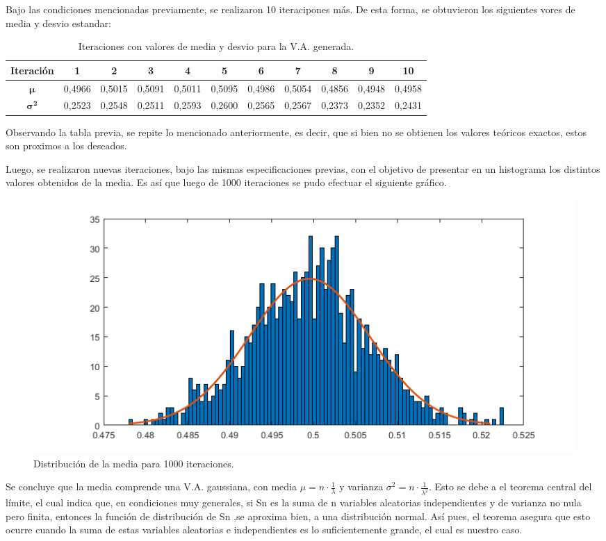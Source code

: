 Bajo las condiciones mencionadas previamente, se realizaron 10 iteracipones más. De esta forma, se obtuvieron los siguientes vores de media y desvio estandar:
\begin{table}[H]
\centering
\begin{tabular}{ccccccccccc}
\hline
\textbf{Iteración}      & \textbf{1} & \textbf{2} & \textbf{3} & \textbf{4} & \textbf{5} & \textbf{6} & \textbf{7} & \textbf{8} & \textbf{9} & \textbf{10} \\ \hline
$\mathbf{\mu}$          & 0,4966     & 0,5015     & 0,5091     & 0,5011     & 0,5095     & 0,4986     & 0,5054     & 0,4856     & 0,4948     & 0,4958      \\
$\mathbf{{\sigma}^{2}}$ & 0,2523     & 0,2548     & 0,2511     & 0,2593     & 0,2600     & 0,2565     & 0,2567     & 0,2373     & 0,2352     & 0,2431     \\ \hline
\end{tabular}
\caption{Iteraciones con valores de media y desvio para la V.A. generada.}
\end{table}

Observando la tabla previa, se repite lo mencionado anteriormente, es decir, que si bien no se obtienen los valores teóricos exactos, estos son proximos a los deseados.

Luego, se realizaron nuevas iteraciones, bajo las mismas especificaciones previas, con el objetivo de presentar en un histograma los distintos valores obtenidos de la media. Es así que luego de 1000 iteraciones se pudo efectuar el siguiente gráfico.
\begin{figure}[H]
	\centering
	\includegraphics[width=0.8\linewidth]{./ImagenesEjercicio1/Media-1.png}
	\caption{Distribución de la media para 1000 iteraciones.}
	\label{fig:media-mc}
\end{figure}

Se concluye que la media comprende una V.A. gaussiana, con media $\mu = n \cdot \frac{1}{\lambda}$
 y varianza $ \sigma ^2 = n \cdot \frac{1}{\lambda ^2}$. Esto se debe a el teorema central del límite, el cual  indica que, en condiciones muy generales, si Sn es la suma de n
 variables aleatorias independientes y de varianza no nula pero finita, entonces la función de distribución de Sn ,se aproxima bien, a una distribución normal.
  Así pues, el teorema asegura que esto ocurre cuando la suma de
   estas variables aleatorias e independientes es lo suficientemente grande, el cual es nuestro caso.

